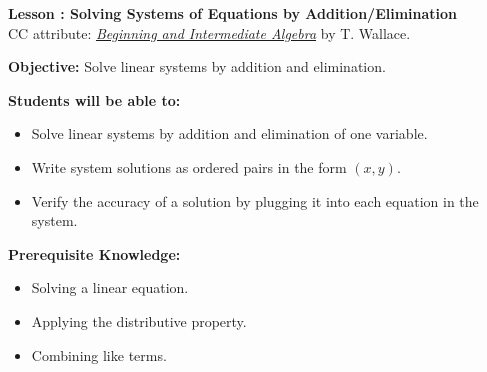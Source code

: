 \documentclass[12pt]{article}
\theoremstyle{definition}
\begin{document}
{\bf \large Lesson : Solving Systems of Equations by Addition/Elimination}\\
CC attribute: \href{http://www.wallace.ccfaculty.org/book/book.html}{\it{Beginning and Intermediate Algebra}} by T. Wallace. \hfill \doclicenseImage[imagewidth=5em]\\
\par
{\bf Objective:} Solve linear systems by addition and elimination.\\
\par
{\bf Students will be able to:}
\begin{itemize}
	\item Solve linear systems by addition and elimination of one variable.
	\item Write system solutions as ordered pairs in the form $(x,y)$.
	\item Verify the accuracy of a solution by plugging it into each equation in the system.
\end{itemize}
{\bf Prerequisite Knowledge:}
\begin{itemize}
	\item Solving a linear equation.
	\item Applying the distributive property.
	\item Combining like terms.
\end{itemize}
\hrulefill
\end{document}
